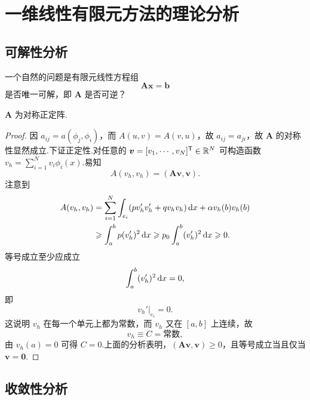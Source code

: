 \section{一维线性有限元方法的理论分析}

\subsection{可解性分析}

一个自然的问题是有限元线性方程组
\begin{equation*}
\boldsymbol{A}\boldsymbol{x} = \boldsymbol{b}
\end{equation*}
是否唯一可解，即 $\boldsymbol{A}$ 是否可逆？

\begin{theorem}
$\boldsymbol{A}$ 为对称正定阵.
\end{theorem}

\begin{proof}
因 $a_{ij} = a(\phi_j, \phi_i)$，而 $A(u,v) = A(v,u)$，故 $a_{ij} = a_{ji}$，故 $\boldsymbol{A}$
的对称性显然成立.下证正定性.对任意的 $\boldsymbol{v} = [v_1,\cdots,v_N]^{\mathsf{T}} \in
\mathbb{R}^N$ 可构造函数 $v_h = \sum_{i=1}^N v_i\phi_i(x)$.易知
\begin{equation*}
A(v_h, v_h) = (\boldsymbol{A}\boldsymbol{v}, \boldsymbol{v}).
\end{equation*}
注意到
\begin{align*}
A(v_h, v_h) &= \sum_{i=1}^{N} \int_{e_i}(pv_h' v_h' + qv_h v_h)\mathop{}\!\mathrm{d} x + \alpha v_h(b) v_h(b) \\
&\geqslant \int_a^b p(v_h')^2 \mathop{}\!\mathrm{d} x \geqslant p_0 \int_a^b (v_h')^2 \mathop{}\!\mathrm{d} x \geqslant 0.
\end{align*}
等号成立至少应成立
\begin{equation*}
\int_a^b (v_h')^2 \mathop{}\!\mathrm{d} x = 0,
\end{equation*}
即
\begin{equation*}
v_h'\big|_{e_i} = 0.
\end{equation*}
这说明 $v_h$ 在每一个单元上都为常数，而 $v_h$ 又在 $[a,b]$ 上连续，故
\begin{equation*}
v_h \equiv C = \text{常数},
\end{equation*}
由 $v_h(a) = 0$ 可得 $C = 0$.上面的分析表明，$(\boldsymbol{A}\boldsymbol{v}, \boldsymbol{v}) \geq
 0$，且等号成立当且仅当 $\boldsymbol{v} = \boldsymbol{0}$.
\end{proof}

\subsection{收敛性分析}

